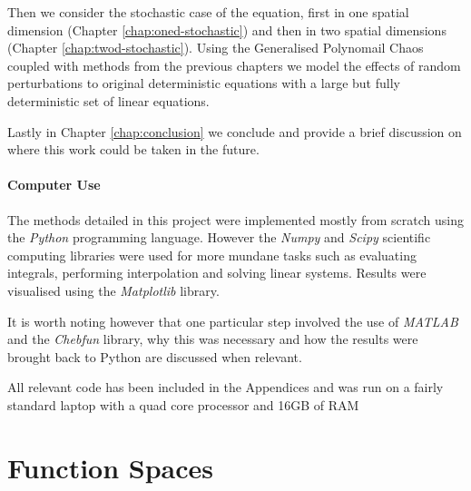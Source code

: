 Then we consider the stochastic case of the equation, first in one spatial
dimension (Chapter \ref{chap:oned-stochastic}) and then in two spatial
dimensions (Chapter \ref{chap:twod-stochastic}). Using the Generalised
Polynomail Chaos coupled with methods from the previous chapters we model the
effects of random perturbations to original deterministic equations with a
large but fully deterministic set of linear equations.

Lastly in Chapter \ref{chap:conclusion} we conclude and provide a brief
discussion on where this work could be taken in the future.

\paragraph{Computer Use}

The methods detailed in this project were implemented mostly from scratch using
the \textit{Python} programming language. However the \textit{Numpy} and
\textit{Scipy} scientific computing libraries were used for more mundane tasks
such as evaluating integrals, performing interpolation and solving linear
systems. Results were visualised using the \textit{Matplotlib} library.

It is worth noting however that one particular step involved
the use of \textit{MATLAB} and the \textit{Chebfun} library, why this was
necessary and how the results were brought back to Python are discussed when
relevant.

All relevant code has been included in the Appendices and was run on a fairly
standard laptop with a quad core processor and 16GB of RAM

\section{Function Spaces}\label{sec:definitions}

